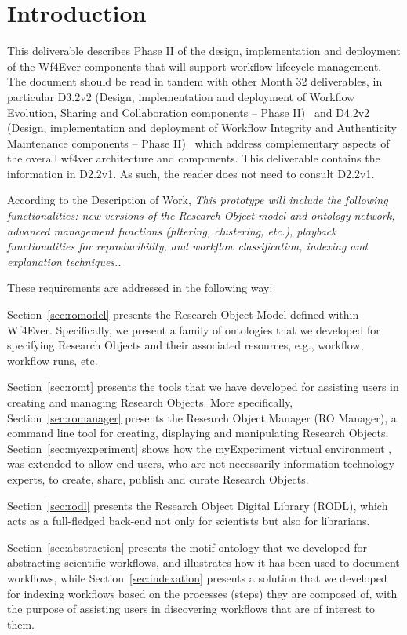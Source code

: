 \section{Introduction}

This deliverable describes Phase II of the design, implementation and
deployment of the Wf4Ever components that will support workflow
lifecycle management. The document should be read in tandem with other
Month 32 deliverables, in particular D3.2v2 (Design, implementation
and deployment of Workflow Evolution, Sharing and Collaboration
components -- Phase II)~\cite{D3.2v2} and D4.2v2 (Design,
implementation and deployment of Workflow Integrity and Authenticity
Maintenance components -- Phase II)~\cite{D4.2v2} which address
complementary aspects of the overall wf4ver architecture and
components. This deliverable contains the information in D2.2v1. As such, the reader does not need to consult D2.2v1.

According to the Description of Work, \emph{This prototype will include the following functionalities: new versions of the Research Object model and ontology network, advanced management functions (filtering, clustering, etc.), playback functionalities for reproducibility, and workflow classification, indexing and explanation techniques.}. 

These requirements are addressed in the following way:

Section~\ref{sec:romodel} presents the Research Object Model defined within Wf4Ever. Specifically, we present a family of ontologies that we developed for specifying Research Objects and their associated resources, e.g., workflow, workflow runs, etc. 

Section~\ref{sec:romt} presents the tools that we have developed for assisting users in creating and managing Research Objects. More specifically, Section~\ref{sec:romanager} presents the Research Object Manager (RO Manager), a command line tool for creating, displaying and manipulating Research Objects. Section~\ref{sec:myexperiment} shows how the myExperiment virtual environment \cite{DBLP:journals/fgcs/RoureGS09}, was extended to allow end-users, who are not necessarily information technology experts, to create, share, publish and curate Research Objects.

Section~\ref{sec:rodl} presents the Research Object Digital Library (RODL), which acts as a full-fledged back-end not only for scientists but also for librarians. 

Section~\ref{sec:abstraction} presents the motif ontology that we developed for abstracting scientific workflows, and illustrates how it has been used to document workflows, while Section~\ref{sec:indexation} presents a solution that we developed for indexing workflows based on the processes (steps) they are composed of, with the purpose of assisting users in discovering workflows that are of interest to them. 
